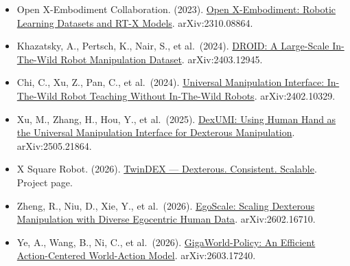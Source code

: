 \vspace{0.25em}
\begin{itemize}
\tightlist
\item
  Open X-Embodiment Collaboration. (2023). \href{https://arxiv.org/abs/2310.08864}{Open X-Embodiment: Robotic Learning Datasets and RT-X Models}. arXiv:2310.08864.
\item
  Khazatsky, A., Pertsch, K., Nair, S., et al.~(2024). \href{https://arxiv.org/abs/2403.12945}{DROID: A Large-Scale In-The-Wild Robot Manipulation Dataset}. arXiv:2403.12945.
\item
  Chi, C., Xu, Z., Pan, C., et al.~(2024). \href{https://arxiv.org/abs/2402.10329}{Universal Manipulation Interface: In-The-Wild Robot Teaching Without In-The-Wild Robots}. arXiv:2402.10329.
\item
  Xu, M., Zhang, H., Hou, Y., et al.~(2025). \href{https://arxiv.org/abs/2505.21864}{DexUMI: Using Human Hand as the Universal Manipulation Interface for Dexterous Manipulation}. arXiv:2505.21864.
\item
  X Square Robot. (2026). \href{https://x2robot.com/en/pages/twindex}{TwinDEX --- Dexterous. Consistent. Scalable}. Project page.
\item
  Zheng, R., Niu, D., Xie, Y., et al.~(2026). \href{https://arxiv.org/abs/2602.16710}{EgoScale: Scaling Dexterous Manipulation with Diverse Egocentric Human Data}. arXiv:2602.16710.
\item
  Ye, A., Wang, B., Ni, C., et al.~(2026). \href{https://arxiv.org/abs/2603.17240}{GigaWorld-Policy: An Efficient Action-Centered World-Action Model}. arXiv:2603.17240.
\end{itemize}

\clearpage
